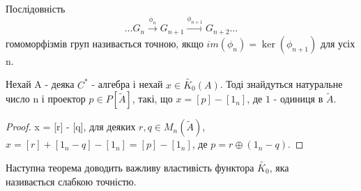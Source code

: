 Послідовність
\[
    \dots G_n \xrightarrow{\phi_n} G_{n+1} \xrightarrow{\phi_{n+1}} G_{n+2} \dots
\]
гомоморфізмів груп називається точною, якщо $im(\phi_n) = \ker(\phi_{n+1})$ для усіх n.

\begin{remark}
    Нехай A - деяка $C^*$ - алгебра і нехай $x \in \widetilde{K_0}(A)$.
    Тоді знайдуться натуральне число n і проектор $p \in P[\widetilde{A}]$,
    такі, що $x = [p] - [1_n]$, де $1$ - одиниця в $\widetilde{A}$.
    \begin{proof}
        x = [r] - [q], для деяких $r,q \in M_n(\widetilde{A})$, $x = [r] + [1_n - q] - [1_n] = [p] - [1_n]$,
        де $p = r \oplus (1_n - q)$.
    \end{proof}
\end{remark}
Наступна теорема доводить важливу властивість функтора $\widetilde{K_0}$, яка \\
називається слабкою точністю.

